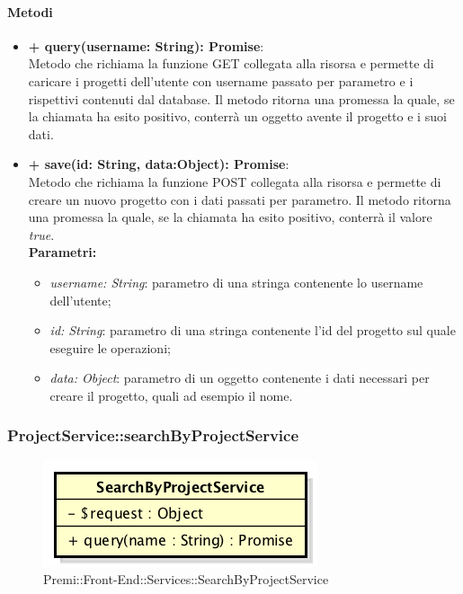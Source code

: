 		\paragraph{Metodi}
		\begin{itemize}
			\item \textbf{+ query(username: String): Promise}:\\
			Metodo che richiama la funzione GET collegata alla risorsa e permette di caricare i progetti dell'utente con username passato per parametro e i rispettivi contenuti dal database. Il metodo ritorna una promessa la quale, se la chiamata ha esito positivo, conterrà un oggetto avente il progetto e i suoi dati.\\
			\item \textbf{+ save(id: String, data:Object): Promise}:\\
			Metodo che richiama la funzione POST collegata alla risorsa e permette di creare un nuovo progetto con i dati passati per parametro. Il metodo ritorna una promessa la quale, se la chiamata ha esito positivo, conterrà il valore \textit{true}.\\
			\textbf{Parametri:}\\
			\begin{itemize}
				\item \textit{username: String}: parametro di una stringa contenente lo username dell'utente;
				\item \textit{id: String}: parametro di una stringa contenente l'id del progetto sul quale eseguire le operazioni;
				\item \textit{data: Object}: parametro di un oggetto contenente i dati necessari per creare il progetto, quali ad esempio il nome.
			\end{itemize}
		\end{itemize}
\newpage
		
		
		\subsubsection{ProjectService::searchByProjectService}
		\begin{figure}[h]
			\centering
				\includegraphics[width=0.4\linewidth]{img/premi_front_end_services_searchbyprojectservice}
			\caption[Premi::Front-End::Services::SearchByProjectService]{Premi::Front-End::Services::SearchByProjectService}
		\end{figure}
		
